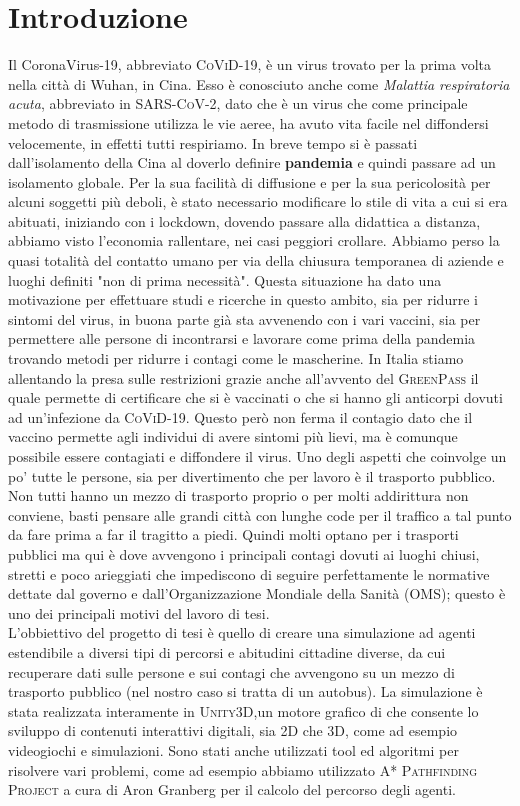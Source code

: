 \documentclass[12pt, openany]{book}
\begin{document}
	\chapter*{Introduzione}	
		Il CoronaVirus-19, abbreviato \textsc{CoViD-19}, è un virus trovato per la prima volta nella città di Wuhan, in Cina. Esso è conosciuto anche come \emph{Malattia respiratoria acuta}, abbreviato in \textsc{SARS-CoV-2}, dato che è un virus che come principale metodo di trasmissione utilizza le vie aeree, ha avuto vita facile nel diffondersi velocemente, in effetti tutti respiriamo. In breve tempo si è passati dall'isolamento della Cina al doverlo definire \textbf{pandemia} e quindi passare ad un isolamento globale.
		Per la sua facilità di diffusione e per la sua pericolosità per alcuni soggetti più deboli, è stato necessario modificare lo stile di vita a cui si era abituati, iniziando con i lockdown, dovendo passare alla didattica a distanza, abbiamo visto l'economia rallentare, nei casi peggiori crollare. Abbiamo perso la quasi totalità del contatto umano per via  della chiusura temporanea di aziende e luoghi definiti "non di prima necessità".
		Questa situazione ha dato una motivazione per effettuare studi e ricerche in questo ambito, sia per ridurre i sintomi del virus, in buona parte già sta avvenendo con i vari vaccini, sia per permettere alle persone di incontrarsi e lavorare come prima della pandemia trovando metodi per ridurre i contagi come le mascherine. In Italia stiamo allentando la presa sulle restrizioni grazie anche all'avvento del \textsc{GreenPass} il quale permette di certificare che si è vaccinati o che si hanno gli anticorpi dovuti ad un'infezione da \textsc{CoViD-19}. Questo però non ferma il contagio dato che il vaccino permette agli individui di avere sintomi più lievi, ma è comunque possibile essere contagiati e diffondere il virus. 
		Uno degli aspetti che coinvolge un po' tutte le persone, sia per divertimento che per lavoro è il trasporto pubblico. Non tutti hanno un mezzo di trasporto proprio o per molti addirittura non conviene, basti pensare alle grandi città con lunghe code per il traffico a tal punto da fare prima a far il tragitto a piedi. Quindi molti optano per i trasporti pubblici ma qui è dove avvengono i principali contagi dovuti ai luoghi chiusi, stretti e poco arieggiati che impediscono di seguire perfettamente le normative dettate dal governo e dall'Organizzazione Mondiale della Sanità (OMS); questo è uno dei principali motivi del lavoro di tesi.\\
		L'obbiettivo del progetto di tesi è quello di creare una simulazione ad agenti estendibile a diversi tipi di percorsi e abitudini cittadine diverse, da cui recuperare dati sulle persone e sui contagi che avvengono su un mezzo di trasporto pubblico (nel nostro caso si tratta di un autobus). La simulazione è stata realizzata interamente in \textsc{Unity3D},un motore grafico di che consente lo sviluppo di contenuti interattivi digitali, sia 2D che 3D, come ad esempio videogiochi e simulazioni. Sono stati anche utilizzati tool ed algoritmi per risolvere  vari problemi, come ad esempio abbiamo utilizzato \textsc{A* Pathfinding Project} a cura di Aron Granberg per il calcolo del percorso degli agenti. 
\end{document}
